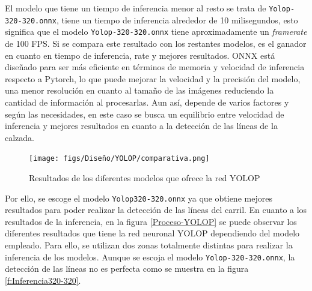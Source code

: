 El modelo que tiene un tiempo de inferencia menor al resto se trata de \texttt{Yolop-320-320.onnx}, tiene un tiempo de inferencia alrededor de 10 milisegundos, esto
significa que el modelo \texttt{Yolop-320-320.onnx} tiene aproximadamente un \textit{framerate} de 100 FPS. Si se compara este resultado con los restantes modelos, es el ganador en cuanto 
en tiempo de inferencia, rate y mejores resultados. 
ONNX está diseñado para ser más eficiente en términos de memoria y velocidad de inferencia respecto a Pytorch, lo que puede mejorar la velocidad y la precisión
del modelo, una menor resolución en cuanto al tamaño de las imágenes reduciendo la cantidad de información al procesarlas. Aun así, depende de varios factores y según las necesidades, 
en este caso se busca un equilibrio entre velocidad de inferencia y mejores resultados en cuanto a la detección de las líneas de la calzada. 

\begin{figure} [H]
  \begin{center}
    \texttt{[image: figs/Diseño/YOLOP/comparativa.png]}
  \end{center}
  \caption{Resultados de los diferentes modelos que ofrece la red YOLOP}
  \label{fig:resultados_pesos_preentrenados}
  \vspace{-1.5em}
\end{figure}
Por ello, se escoge el modelo \texttt{Yolop320-320.onnx} ya que obtiene mejores resultados para poder realizar la detección de las líneas del carril. 
En cuanto a los resultados de la inferencia, en la figura \ref{Proceso-YOLOP} 
se puede observar los diferentes resultados que tiene la red neuronal YOLOP dependiendo del modelo empleado. Para ello, se utilizan dos zonas totalmente distintas para realizar 
la inferencia de los modelos. Aunque se escoja el modelo \texttt{Yolop-320-320.onnx}, la detección de las líneas no es perfecta como se muestra en la figura 
\ref{f:Inferencia320-320}. 

